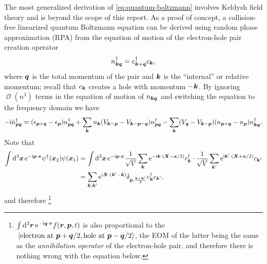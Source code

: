 \documentclass[hyperref, a4paper]{article}
\newcommand*{\ii}{\mathrm{i}}
\newcommand*{\ee}{\mathrm{e}}
\DeclareMathOperator{\bigO}{\mathcal{O}}
\begin{document}
The most generalized derivation of \eqref{eq:quantum-boltzmann} 
involves Keldysh field theory 
\cite{RevModPhys.58.323}
and is beyond the scope of this report.
As a proof of concept,
a collision-free linearized quantum Boltzmann equation can be derived 
using random phase approximation (RPA) 
from the equation of motion of the electron-hole pair creation operator
\begin{equation}
    n_{\vb*{k} \vb*{q}}^\dagger = c^\dagger_{\vb*{k} + \vb*{q}} c_{\vb*{k}},
\end{equation}
where $\vb*{q}$ is the total momentum of the pair 
and $\vb*{k}$ is the ``internal'' or relative momentum;
recall that $c_{\vb*{k}}$ creates a hole with momentum $- \vb*{k}$.
By ignoring $\bigO(n^3)$ terms in the equation of motion of $n_{\vb*{k} \vb*{q}}$
and switching the equation to the frequency domain
we have \cite{pines2018theory}
\begin{equation}
    - \ii \dot{n}_{\vb*{p} \vb*{q}}^\dagger
    = (\epsilon_{\vb*{p} + \vb*{q}} - \epsilon_{\vb*{p}}) n^\dagger_{\vb*{p} \vb*{q}}
    + \sum_{\vb*{k}} n_{\vb*{k}} (V_{\vb*{k} - \vb*{p}} - V_{\vb*{k} - \vb*{p} - \vb*{q}}) n^\dagger_{\vb*{p} \vb*{q}}
    - \sum_{\vb*{k}} (V_{\vb*{q}} - V_{\vb*{k} - \vb*{p}})
    (n_{\vb*{p} + \vb*{q}} - n_{\vb*{p}})
    n^\dagger_{\vb*{k} \vb*{q}}.
    \label{eq:eom-density}
\end{equation}
Note that 
\begin{equation}
    \begin{aligned}
        \int \dd[3]{\vb*{x}} \ee^{- \ii \vb*{p} \cdot \vb*{x}} \psi^\dagger(\vb*{x}_2) \psi(\vb*{x}_1) 
        &= \int \dd[3]{\vb*{x}} \ee^{- \ii \vb*{p} \cdot \vb*{x}}
        \frac{1}{\sqrt{V}} \sum_{\vb*{k}} \ee^{- \ii \vb*{k} \cdot (\vb*{X} - \vb*{x} /2 )} c_{\vb*{k}}^\dagger
        \cdot \frac{1}{\sqrt{V}} \sum_{\vb*{k}'} \ee^{\ii \vb*{k}' \cdot (\vb*{X} + \vb*{x} / 2)} c_{\vb*{k}'} \\
        &= \sum_{\vb*{k}, \vb*{k}'} \ee^{\ii \vb*{X} \cdot (\vb*{k}' - \vb*{k})}
        \delta_{\vb*{p}, \frac{\vb*{k} + \vb*{k}'}{2}} c^\dagger_{\vb*{k}} c_{\vb*{k}'},
    \end{aligned}
\end{equation}
and therefore%
\footnote{
    $\int \dd[3]{\vb*{r}} \ee^{- \ii \vb*{q} \cdot \vb*{r}} f(\vb*{r}, \vb*{p}, t)$ 
    is also proportional to the 
    $\ket*{\text{electron at $\vb*{p} + \vb*{q} / 2$}, \text{hole at $\vb*{p} - \vb*{q} / 2$}}$,
    the EOM of the latter being the same as 
    the \emph{annihilation operator} of the electron-hole pair,
    and therefore there is nothing wrong with the equation below.
}
\end{document}

